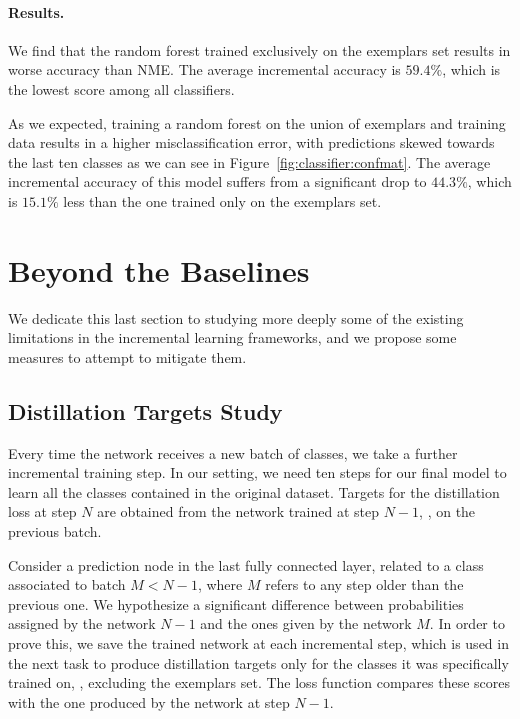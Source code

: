 \documentclass[10pt,twocolumn,letterpaper]{article}
\begin{document}
\paragraph{Results.}
We find that the random forest trained exclusively on the exemplars set results in worse accuracy than NME. The average incremental accuracy is $59.4\%$, which is the lowest score among all classifiers. 

As we expected, training a random forest on the union of exemplars and training data results in a higher misclassification error, with predictions skewed towards the last ten classes as we can see in Figure~\ref{fig:classifier:confmat}. The average incremental accuracy of this model suffers from a significant drop to $44.3\%$, which is $15.1\%$ less than the one trained only on the exemplars set.

\section{Beyond the Baselines}

We dedicate this last section to studying more deeply some of the existing limitations in the incremental learning frameworks, and we propose some measures to attempt to mitigate them.

\subsection{Distillation Targets Study}
Every time the network receives a new batch of classes, we take a further incremental training step. In our setting, we need ten steps for our final model to learn all the classes contained in the original dataset. Targets for the distillation loss at step $N$ are obtained from the network trained at step $N-1$, \ie, on the previous batch.

Consider a prediction node in the last fully connected layer, related to a class associated to batch $M<N-1$, where $M$ refers to any step older than the previous one. We hypothesize a significant difference between probabilities assigned by the network $N-1$ and the ones given by the network $M$. In order to prove this, we save the trained network at each incremental step, which is used in the next task to produce distillation targets only for the classes it was specifically trained on, \ie, excluding the exemplars set. The loss function compares these scores with the one produced by the network at step $N-1$.
\end{document}
